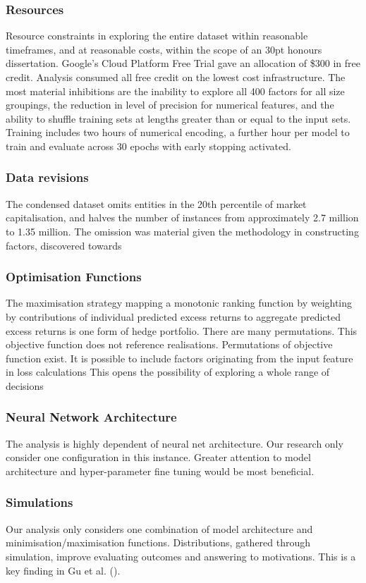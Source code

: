 \documentclass[12pt]{article}
\begin{document}
\subsubsection{Resources}
Resource constraints in exploring the entire dataset within reasonable timeframes, and at reasonable costs, within the scope of an 30pt honours dissertation.
Google's Cloud Platform Free Trial gave an allocation of \$300 in free credit. Analysis consumed all free credit on the lowest cost infrastructure.
The most material inhibitions are the inability to explore all 400 factors for all size groupings, the reduction in level of precision for numerical features, and
the ability to shuffle training sets at lengths greater than or equal to the input sets.
Training includes two hours of numerical encoding, a further hour per model to train and evaluate across 30 epochs with early stopping activated.
\subsubsection{Data revisions}
The condensed dataset omits entities in the 20th percentile of market capitalisation, and halves the number of instances from approximately 2.7 million to 1.35 million.
The omission was material given the methodology in constructing factors, discovered towards
\subsubsection{Optimisation Functions}
The maximisation strategy mapping a monotonic ranking function by weighting by contributions of individual predicted excess returns to aggregate predicted excess returns is one form of hedge portfolio.
There are many permutations.
This objective function does not reference realisations.
Permutations of objective function exist.
It is possible to include factors originating from the input feature in loss calculations
This opens the possibility of exploring a whole range of decisions
\subsubsection{Neural Network Architecture}
The analysis is highly dependent of neural net architecture.
Our research only consider one configuration in this instance.
Greater attention to model architecture and hyper-parameter fine tuning would be most beneficial.
\subsubsection*{Simulations}
Our analysis only considers one combination of model architecture and minimisation/maximisation functions.
Distributions, gathered through simulation, improve evaluating outcomes and answering to motivations.
This is a key finding in Gu et al. (\citeyear{eapvml}).
\end{document}
